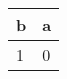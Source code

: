 \documentclass{article}[12pt]
\begin{document}
\centering
\begin{tabular}{ll}
b&a\\
\hline
1&0
\end{tabular}

  
\end{document}
